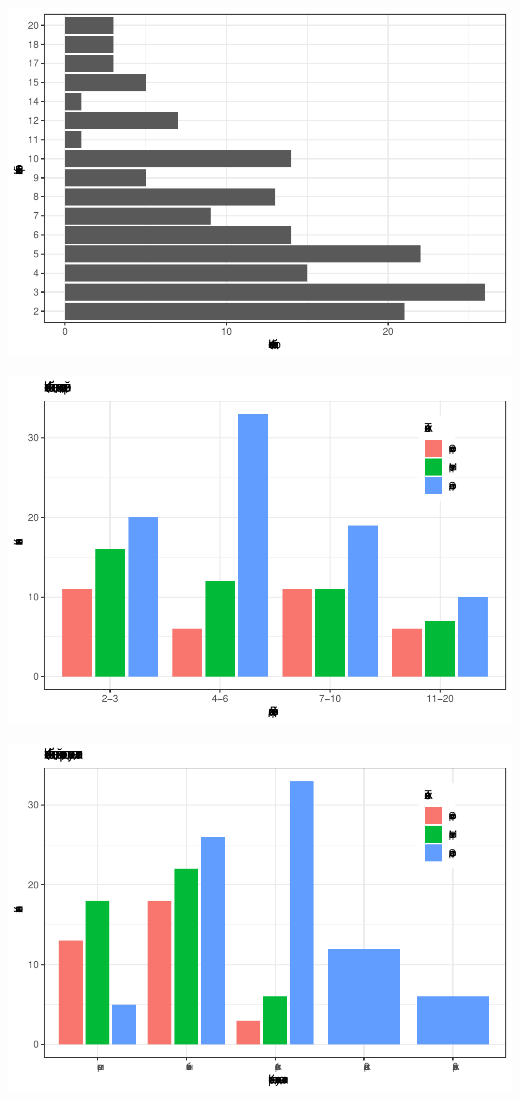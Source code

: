 \documentclass[
]{article}
\begin{document}
\begin{center}\includegraphics[width=0.85\linewidth]{Regression-model-for-estimating-RM_files/figure-latex/unnamed-chunk-26-2} \end{center}

\begin{center}\includegraphics[width=0.85\linewidth]{Regression-model-for-estimating-RM_files/figure-latex/unnamed-chunk-26-3} \end{center}

\begin{center}\includegraphics[width=0.85\linewidth]{Regression-model-for-estimating-RM_files/figure-latex/unnamed-chunk-26-4} \end{center}
\end{document}
